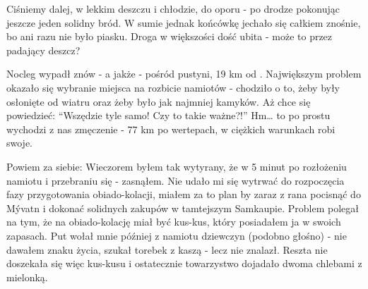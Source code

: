 Ciśniemy dalej, w lekkim deszczu i chłodzie, do oporu - po drodze pokonując jeszcze jeden solidny bród. W sumie jednak końcówkę jechało się całkiem znośnie, bo ani razu nie było piasku. Droga w większości dość ubita - może to przez padający deszcz?


Nocleg wypadł znów - a jakże - pośród pustyni, 19 km od . Największym problem okazało się wybranie miejsca na rozbicie namiotów - chodziło o to, żeby były osłonięte od wiatru oraz żeby było jak najmniej kamyków. Aż chce się powiedzieć: “Wszędzie tyle samo! Czy to takie ważne?!” Hm… to po prostu wychodzi z nas zmęczenie - 77 km po wertepach, w ciężkich warunkach robi swoje.

Powiem za siebie: Wieczorem byłem tak wytyrany, że w 5 minut po rozłożeniu namiotu i przebraniu się - zasnąłem. Nie udało mi się wytrwać do rozpoczęcia fazy przygotowania obiado-kolacji, miałem za to plan by zaraz z rana pocisnąć do Mývatn i dokonać solidnych zakupów w tamtejszym Samkaupie. Problem polegał na tym, że na obiado-kolację miał być kus-kus, który posiadałem ja w swoich zapasach. Put wołał mnie później z namiotu dziewczyn (podobno głośno) - nie dawałem znaku życia, szukał torebek z kaszą - lecz nie znalazł. Reszta nie doszekała się więc kus-kusu i ostatecznie towarzystwo dojadało dwoma chlebami z mielonką.
